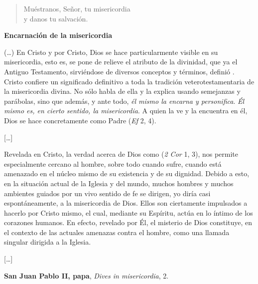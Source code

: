 \begin{liturgiabox}{ }
	\begin{quote}	
		Muéstranos, Señor, tu misericordia \\y danos tu salvación. 
	\end{quote}	
	\begin{liturgiatext}
		\textbf{Encarnación de la misericordia}
		
		(\ldots{}) En Cristo y por Cristo, Dios se hace particularmente visible en su misericordia, esto es, se pone de relieve el atributo de la divinidad, que ya el Antiguo Testamento, sirviéndose de diversos conceptos y términos, definió . Cristo confiere un significado definitivo a toda la tradición veterotestamentaria de la misericordia divina. No sólo habla de ella y la explica usando semejanzas y parábolas, sino que además, y ante todo, \emph{él mismo la encarna y personifica}. \emph{Él mismo es, en cierto sentido, la misericordia}. A quien la ve y la encuentra en él, Dios se hace concretamente  como Padre  (\emph{Ef} 2, 4).
		
		{[}\ldots{}{]}
		
		Revelada en Cristo, la verdad acerca de Dios como  (\emph{2 Cor} 1, 3), nos permite  especialmente cercano al hombre, sobre todo cuando sufre, cuando está amenazado en el núcleo mismo de su existencia y de su dignidad. Debido a esto, en la situación actual de la Iglesia y del mundo, muchos hombres y muchos ambientes guiados por un vivo sentido de fe se dirigen, yo diría casi espontáneamente, a la misericordia de Dios. Ellos son ciertamente impulsados a hacerlo por Cristo mismo, el cual, mediante su Espíritu, actúa en lo íntimo de los corazones humanos. En efecto, revelado por Él, el misterio de Dios  constituye, en el contexto de las actuales amenazas contra el hombre, como una llamada singular dirigida a la Iglesia.
		
		{[}\ldots{}{]}
		
		\textbf{San Juan Pablo II, papa}, \emph{Dives in misericordia}, 2.
	\end{liturgiatext}
	
\end{liturgiabox}

\newpage

